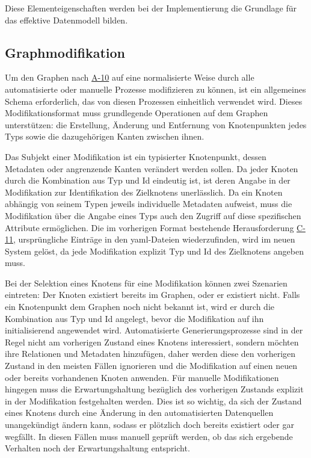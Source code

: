 Diese Elementeigenschaften werden bei der Implementierung die Grundlage für das effektive Datenmodell bilden.

\subsection{Graphmodifikation}\label{subsec:model-graph-modification}

Um den Graphen nach \hyperref[subsec:req-manual-format-modification]{A-10} auf eine normalisierte Weise durch alle automatisierte oder manuelle Prozesse modifizieren zu können, ist ein allgemeines Schema erforderlich, das von diesen Prozessen einheitlich verwendet wird.
Dieses Modifikationsformat muss grundlegende Operationen auf dem Graphen unterstützen: die Erstellung, Änderung und Entfernung von Knotenpunkten jedes Typs sowie die dazugehörigen Kanten zwischen ihnen.

Das Subjekt einer Modifikation ist ein typisierter Knotenpunkt, dessen Metadaten oder angrenzende Kanten verändert werden sollen.
Da jeder Knoten durch die Kombination aus Typ und Id eindeutig ist, ist deren Angabe in der Modifikation zur Identifikation des Zielknotens unerlässlich.
Da ein Knoten abhängig von seinem Typen jeweils individuelle Metadaten aufweist, muss die Modifikation über die Angabe eines Typs auch den Zugriff auf diese spezifischen Attribute ermöglichen.
Die im vorherigen Format bestehende Herausforderung \hyperref[subsec:c-11-finding-yaml-entries]{C-11}, ursprüngliche Einträge in den \acrshort{yaml}-Dateien wiederzufinden, wird im neuen System gelöst, da jede Modifikation explizit Typ und Id des Zielknotens angeben muss.

Bei der Selektion eines Knotens für eine Modifikation können zwei Szenarien eintreten: Der Knoten existiert bereits im Graphen, oder er existiert nicht.
Falls ein Knotenpunkt dem Graphen noch nicht bekannt ist, wird er durch die Kombination aus Typ und Id angelegt, bevor die Modifikation auf ihn initialisierend angewendet wird.
Automatisierte Generierungsprozesse sind in der Regel nicht am vorherigen Zustand eines Knotens interessiert, sondern möchten ihre Relationen und Metadaten hinzufügen, daher werden diese den vorherigen Zustand in den meisten Fällen ignorieren und die Modifikation auf einen neuen oder bereits vorhandenen Knoten anwenden.
Für manuelle Modifikationen hingegen muss die Erwartungshaltung bezüglich des vorherigen Zustands explizit in der Modifikation festgehalten werden.
Dies ist so wichtig, da sich der Zustand eines Knotens durch eine Änderung in den automatisierten Datenquellen unangekündigt ändern kann, sodass er plötzlich doch bereits existiert oder gar wegfällt.
In diesen Fällen muss manuell geprüft werden, ob das sich ergebende Verhalten noch der Erwartungshaltung entspricht.


